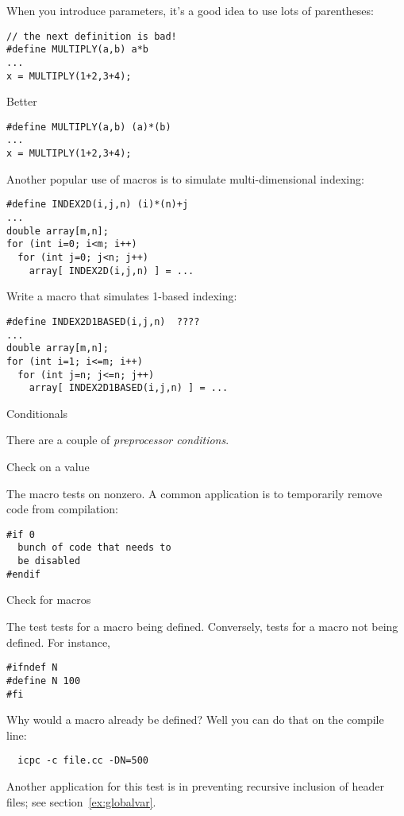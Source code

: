 When you introduce parameters, it's a good idea to use lots of parentheses:
\begin{verbatim}
// the next definition is bad!
#define MULTIPLY(a,b) a*b
...
x = MULTIPLY(1+2,3+4);
\end{verbatim}
Better
\begin{verbatim}
#define MULTIPLY(a,b) (a)*(b)
...
x = MULTIPLY(1+2,3+4);
\end{verbatim}

Another popular use of macros is to simulate multi-dimensional indexing:
\begin{verbatim}
#define INDEX2D(i,j,n) (i)*(n)+j
...
double array[m,n];
for (int i=0; i<m; i++)
  for (int j=0; j<n; j++)
    array[ INDEX2D(i,j,n) ] = ...
\end{verbatim}

\begin{exercise}
  Write a macro that simulates 1-based indexing:
\begin{verbatim}
#define INDEX2D1BASED(i,j,n)  ????
...
double array[m,n];
for (int i=1; i<=m; i++)
  for (int j=n; j<=n; j++)
    array[ INDEX2D1BASED(i,j,n) ] = ...
\end{verbatim}
\end{exercise}


 {Conditionals}


There are a couple of \emph{preprocessor conditions}.

 {Check on a value}

The  macro tests on nonzero. A common application is to
temporarily remove code from compilation:
\begin{verbatim}
#if 0
  bunch of code that needs to
  be disabled
#endif
\end{verbatim}

 {Check for macros}

The  test tests for a macro being defined. Conversely,
 tests for a macro not being defined. For instance,
\begin{verbatim}
#ifndef N
#define N 100
#fi
\end{verbatim}
Why would a macro already be defined? Well you can do that on the
compile line:
\begin{verbatim}
  icpc -c file.cc -DN=500
\end{verbatim}

Another application for this test is in preventing recursive inclusion
of header files; see section~\ref{ex:globalvar}.


